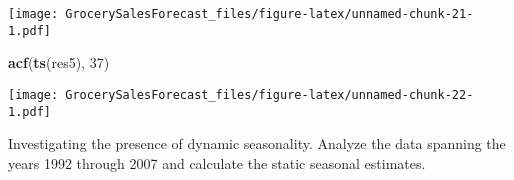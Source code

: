 \documentclass[
]{article}
\newenvironment{Shaded}{\begin{snugshade}}{\end{snugshade}}
\newcommand{\AttributeTok}[1]{\textcolor[rgb]{0.13,0.29,0.53}{#1}}
\newcommand{\CommentTok}[1]{\textcolor[rgb]{0.56,0.35,0.01}{\textit{#1}}}
\newcommand{\DecValTok}[1]{\textcolor[rgb]{0.00,0.00,0.81}{#1}}
\newcommand{\FunctionTok}[1]{\textcolor[rgb]{0.13,0.29,0.53}{\textbf{#1}}}
\newcommand{\NormalTok}[1]{#1}
\newcommand{\OtherTok}[1]{\textcolor[rgb]{0.56,0.35,0.01}{#1}}
\newcommand{\SpecialCharTok}[1]{\textcolor[rgb]{0.81,0.36,0.00}{\textbf{#1}}}
\begin{document}
\texttt{[image: GrocerySalesForecast\_files/figure-latex/unnamed-chunk-21-1.pdf]}

\begin{Shaded}
\begin{Highlighting}[]
\FunctionTok{acf}\NormalTok{(}\FunctionTok{ts}\NormalTok{(res5), }\DecValTok{37}\NormalTok{)}
\end{Highlighting}
\end{Shaded}

\texttt{[image: GrocerySalesForecast\_files/figure-latex/unnamed-chunk-22-1.pdf]}

Investigating the presence of dynamic seasonality. Analyze the data
spanning the years 1992 through 2007 and calculate the static seasonal
estimates.

\begin{Shaded}
\end{Shaded}
\end{document}
